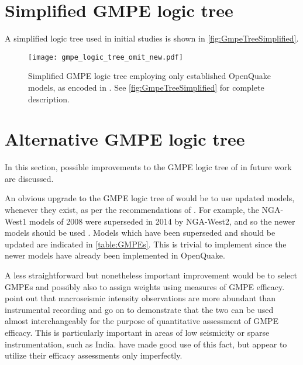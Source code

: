 \documentclass{article}
\begin{document}
\begin{appendices}

\section{Simplified GMPE logic tree}
\label{app:SimplifiedGmpeLogicTree}

A simplified logic tree used in initial studies is shown in \autoref{fig:GmpeTreeSimplified}.

\begin{figure}[!htb]
\begin{adjustbox}{center}
\texttt{[image: gmpe\_logic\_tree\_omit\_new.pdf]}
\end{adjustbox}
\caption[Simplified GMPE logic tree]{Simplified GMPE logic tree employing only established OpenQuake models, as encoded in \texttt{}.
See \autoref{fig:GmpeTreeSimplified} for complete description.}
\label{fig:GmpeTreeSimplified}
\end{figure}

\section{Alternative GMPE logic tree}
\label{app:AlternativeGmpes}

In this section, possible improvements to the GMPE logic tree of \cite{nath2012probabilistic} in future work are discussed.

An obvious upgrade to the GMPE logic tree of \cite{nath2012probabilistic} would be to use updated models, whenever they exist, as per the recommendations of \cite{cotton2006criteria}. 
For example, the NGA-West1 models of 2008 were superseded in 2014 by NGA-West2, and so the newer models should be used \cite{bozorgnia2014nga}. 
Models which have been superseded and should be updated are indicated in \autoref{table:GMPEs}. 
This is trivial to implement since the newer models have already been implemented in OpenQuake.

A less straightforward but nonetheless important improvement would be to select GMPEs and possibly also to assign weights using measures of GMPE efficacy.
\cite{delavaud2009information} point out that macroseismic intensity observations are more abundant than instrumental recording and go on to demonstrate that the two can be used almost interchangeably for the purpose of quantitative assessment of GMPE efficacy.
This is particularly important in areas of low seismicity or sparse instrumentation, such as India.
\cite{nath2011peak} have made good use of this fact, but \cite{nath2012probabilistic} appear to utilize their efficacy assessments only imperfectly. 


\end{appendices}
\end{document}
